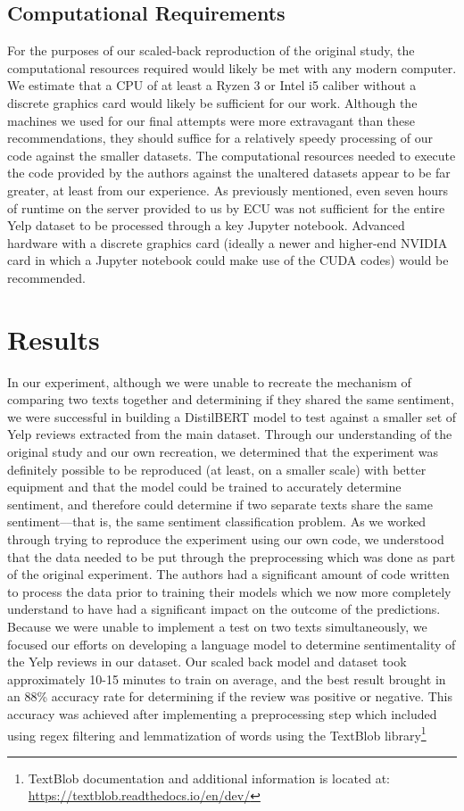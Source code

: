 \documentclass[conference]{IEEEtran}
\begin{document}
\subsection{Computational Requirements}
	For the purposes of our scaled-back reproduction of the original study, the computational resources required would likely be met with any modern computer. We estimate that a CPU of at least a Ryzen 3 or Intel i5 caliber without a discrete graphics card would likely be sufficient for our work. Although the machines we used for our final attempts were more extravagant than these recommendations, they should suffice for a relatively speedy processing of our code against the smaller datasets.
	The computational resources needed to execute the code provided by the authors against the unaltered datasets appear to be far greater, at least from our experience. As previously mentioned, even seven hours of runtime on the server provided to us by ECU was not sufficient for the entire Yelp dataset to be processed through a key Jupyter notebook. Advanced hardware with a discrete graphics card (ideally a newer and higher-end NVIDIA card in which a Jupyter notebook could make use of the CUDA codes) would be recommended. 

\section{Results}
	In our experiment, although we were unable to recreate the mechanism of comparing two texts together and determining if they shared the same sentiment, we were successful in building a DistilBERT model to test against a smaller set of Yelp reviews extracted from the main dataset. Through our understanding of the original study and our own recreation, we determined that the experiment was definitely possible to be reproduced (at least, on a smaller scale) with better equipment and that the model could be trained to accurately determine sentiment, and therefore could determine if two separate texts share the same sentiment--–that is, the same sentiment classification problem.
	As we worked through trying to reproduce the experiment using our own code, we understood that the data needed to be put through the preprocessing which was done as part of the original experiment. The authors had a significant amount of code written to process the data prior to training their models which we now more completely understand to have had a significant impact on the outcome of the predictions.
	Because we were unable to implement a test on two texts simultaneously, we focused our efforts on developing a language model to determine sentimentality of the Yelp reviews in our dataset. Our scaled back model and dataset took approximately 10-15 minutes to train on average, and the best result brought in an 88\% accuracy rate for determining if the review was positive or negative. This accuracy was achieved after implementing a preprocessing step which included using regex filtering and lemmatization of words using the TextBlob library\footnote{TextBlob documentation and additional information  is located at: \url{https://textblob.readthedocs.io/en/dev/}}
\end{document}
